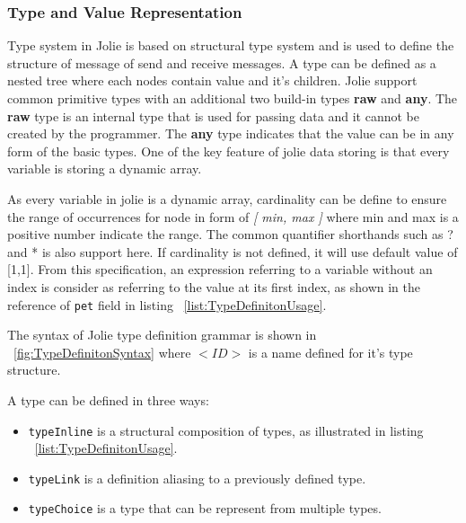 \subsubsection{Type and Value Representation}
\label{sec:jolie-type-def}

Type system in Jolie is based on structural type system and is used to define the structure of message of send and receive messages. A type can be defined as a nested tree where each nodes contain value and it's children. Jolie support common primitive types with an additional two build-in types \textbf{raw} and \textbf{any}. The \textbf{raw} type is an internal type that is used for passing data and it cannot be created by the programmer. The \textbf{any} type indicates that the value can be in any form of the basic types. One of the key feature of jolie data storing is that every variable is storing a dynamic array.

As every variable in jolie is a dynamic array, cardinality can be define to ensure the range of occurrences for node in form of \textit{[ min, max ]} where min and max is a positive number indicate the range. The common quantifier shorthands such as ? and * is also support here. If cardinality is not defined, it will use default value of [1,1]. From this specification, an expression referring to a variable without an index is consider as referring to the value at its first index, as shown in the reference of \texttt{pet} field in listing ~\ref{list:TypeDefinitonUsage}. 

The syntax of Jolie type definition grammar is shown in ~\ref{fig:TypeDefinitonSyntax} where \(<ID>\) is a name defined for it's type structure.

A type can be defined in three ways:
\begin{itemize}
	\item \texttt{typeInline} is a structural composition of types, as illustrated in listing ~\ref{list:TypeDefinitonUsage}.
	\item \texttt{typeLink} is a definition aliasing to a previously defined type.
	\item \texttt{typeChoice} is a type that can be represent from multiple types.
\end{itemize}

